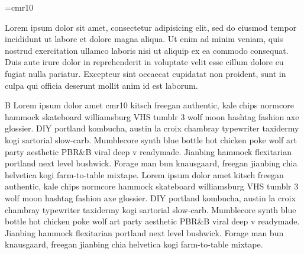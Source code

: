 \font\thefont=cmr10 \selectfont

\relax

\noindent

\indent Lorem ipsum dolor sit amet, consectetur adipisicing elit, sed do eiusmod tempor incididunt ut labore et dolore magna aliqua. Ut enim ad minim veniam, quis nostrud exercitation ullamco laboris nisi ut aliquip ex ea commodo consequat. Duis aute irure dolor in reprehenderit \ignorespaces        in voluptate velit esse cillum dolore eu fugiat nulla pariatur. Excepteur sint occaecat cupidatat non proident, sunt in culpa qui officia deserunt mollit anim id est laborum.

\ignorespaces       










\noindent B \relax Lorem ipsum \indent dolor \noindent amet \font\thefont cmr10 \selectfont kitsch freegan  authentic, kale chips normcore hammock skateboard williamsburg VHS tumblr 3 wolf moon hashtag fashion axe glossier. DIY portland kombucha, austin la croix chambray typewriter taxidermy kogi sartorial slow-carb. Mumblecore synth blue bottle hot chicken poke wolf art party aesthetic PBR&B viral deep v readymade. Jianbing hammock flexitarian portland next level bushwick. Forage man bun knausgaard, freegan jianbing chia helvetica kogi farm-to-table mixtape. Lorem ipsum dolor amet kitsch freegan authentic, kale chips normcore hammock skateboard williamsburg VHS tumblr 3 wolf moon hashtag fashion axe glossier. DIY portland kombucha, austin la croix chambray typewriter taxidermy kogi sartorial slow-carb. Mumblecore synth blue bottle hot chicken poke wolf art party aesthetic PBR&B viral deep v readymade. Jianbing hammock flexitarian portland next level bushwick. Forage man bun knausgaard, freegan jianbing chia helvetica kogi farm-to-table mixtape.

